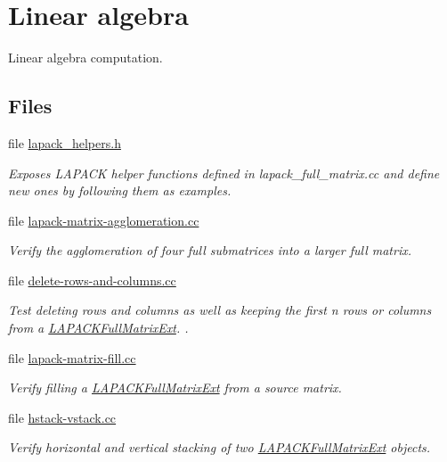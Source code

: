 \hypertarget{group__linalg}{}\section{Linear algebra}
\label{group__linalg}


Linear algebra computation.  


\subsection*{Files}
\begin{DoxyCompactItemize}
\item 
file \hyperlink{lapack__helpers_8h}{lapack\+\_\+helpers.\+h}
\begin{DoxyCompactList}\small\item\em Exposes L\+A\+P\+A\+CK helper functions defined in lapack\+\_\+full\+\_\+matrix.\+cc and define new ones by following them as examples. \end{DoxyCompactList}\item 
file \hyperlink{lapack-matrix-agglomeration_8cc}{lapack-\/matrix-\/agglomeration.\+cc}
\begin{DoxyCompactList}\small\item\em Verify the agglomeration of four full submatrices into a larger full matrix. \end{DoxyCompactList}\item 
file \hyperlink{delete-rows-and-columns_8cc}{delete-\/rows-\/and-\/columns.\+cc}
\begin{DoxyCompactList}\small\item\em Test deleting rows and columns as well as keeping the first {\ttfamily n} rows or columns from a \hyperlink{classLAPACKFullMatrixExt}{L\+A\+P\+A\+C\+K\+Full\+Matrix\+Ext}. . \end{DoxyCompactList}\item 
file \hyperlink{lapack-matrix-fill_8cc}{lapack-\/matrix-\/fill.\+cc}
\begin{DoxyCompactList}\small\item\em Verify filling a \hyperlink{classLAPACKFullMatrixExt}{L\+A\+P\+A\+C\+K\+Full\+Matrix\+Ext} from a source matrix. \end{DoxyCompactList}\item 
file \hyperlink{hstack-vstack_8cc}{hstack-\/vstack.\+cc}
\begin{DoxyCompactList}\small\item\em Verify horizontal and vertical stacking of two \hyperlink{classLAPACKFullMatrixExt}{L\+A\+P\+A\+C\+K\+Full\+Matrix\+Ext} objects. \end{DoxyCompactList}\item 

\end{DoxyCompactItemize}
